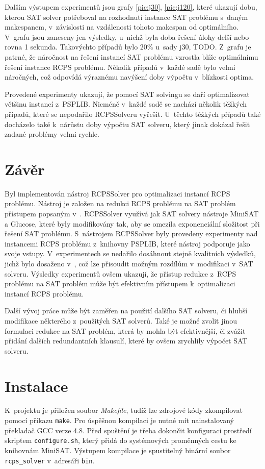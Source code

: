 \documentclass[a4paper, 12pt]{article}
\begin{document}
Dalším výstupem experimentů jsou grafy \ref{pic:j30}, \ref{pic:j120},
které ukazují dobu, kterou SAT solver potřeboval na rozhodnutí instance SAT problému
s~daným makespanem, v~závislosti na vzdálenosti tohoto makespan od optimálního.
V~grafu jsou zaneseny jen výsledky, u~nichž byla doba řešení úlohy delší nebo rovna 1 sekunda.
Takovýchto případů bylo $20\%$ u~sady j30, TODO.
Z~grafu je patrné, že náročnost na řešení instancí SAT problému vzrostla blíže optimálnímu řešení instance RCPS problému.
Několik případů v~každé sadě bylo velmi náročných, což odpovídá výraznému navýšení doby výpočtu v~blízkosti optima.

Provedené experimenty ukazují, že pomocí SAT solvingu se daří optimalizovat většinu instancí z~PSPLIB.
Nicméně v~každé sadě se nachází několik těžkých případů, které se nepodařilo RCPSSolveru vyřešit.
U~těchto těžkých případů také docházelo také k~nárůstu doby výpočtu SAT solveru, který jinak dokázal
řešit zadané problémy velmi rychle.

\section{Závěr}
Byl implementován nástroj RCPSSolver pro optimalizaci instancí RCPS problému.
Nástroj je založen na redukci RCPS problému na SAT problém přístupem popsaným v~\cite{horbach:10}.
RCPSSolver využívá jak SAT solvery nástroje MiniSAT a Glucose, které byly modifikovány tak,
aby se omezila exponenciální složitost při řešení SAT problému.
S~nástrojem RCPSSolver byly provedeny experimenty nad instancemi RCPS problému
z~knihovny PSPLIB, které nástroj podporuje jako svoje vstupy.
V~experimentech se nedařilo dosáhnout stejně kvalitních výsledků, jichž bylo dosaženo v~\cite{horbach:10},
což lze přisoudit možným rozdílům v~modifikaci v~SAT solveru.
Výsledky experimentů ovšem ukazují, že přístup redukce z~RCPS problému na SAT problém
může být efektivním přístupem k~optimalizaci instancí RCPS problému.

Další vývoj práce může být zaměřen na použití dalšího SAT solveru, či hlubší
modifikace některého z~použitých SAT solverů.
Také je možné zvolit jinou formulaci redukce na SAT problém, která by mohla být
efektivnější, či zvážit přidání dalších redundantních klausulí, které by ovšem
zrychlily výpočet SAT solveru.

\newpage
\appendix
\section{Instalace}
\label{app:install}
K~projektu je přiložen soubor \emph{Makefile}, tudíž lze zdrojové kódy zkompilovat pomocí příkazu \texttt{make}.
Pro úspěšnou kompilaci je nutné mít nainstalovaný překladač GCC verze 4.8.
Před spuštění je třeba dokončit konfiguraci prostředí skriptem \texttt{configure.sh},
který přidá do systémových proměnných cestu ke knihovnám MiniSAT.
Výstupem kompilace je spustitelný binární soubor \texttt{rcps\_solver} v~adresáři \texttt{bin}.
\end{document}

